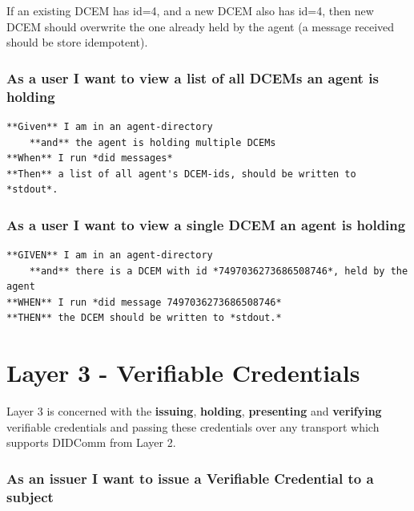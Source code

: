 If an existing DCEM has id=4, and a new DCEM also has id=4, then new
DCEM should overwrite the one already held by the agent (a message
received should be store idempotent).

\hypertarget{as-a-user-i-want-to-view-a-list-of-all-dcems-an-agent-is-holding}{%
\subsubsection{As a user I want to view a list of all DCEMs an agent is
holding}\label{as-a-user-i-want-to-view-a-list-of-all-dcems-an-agent-is-holding}}

\begin{lstlisting}
**Given** I am in an agent-directory
    **and** the agent is holding multiple DCEMs
**When** I run *did messages*
**Then** a list of all agent's DCEM-ids, should be written to *stdout*.
\end{lstlisting}

\hypertarget{as-a-user-i-want-to-view-a-single-dcem-an-agent-is-holding}{%
\subsubsection{As a user I want to view a single DCEM an agent is
holding}\label{as-a-user-i-want-to-view-a-single-dcem-an-agent-is-holding}}

\begin{lstlisting}
**GIVEN** I am in an agent-directory
    **and** there is a DCEM with id *7497036273686508746*, held by the agent
**WHEN** I run *did message 7497036273686508746*
**THEN** the DCEM should be written to *stdout.*
\end{lstlisting}

\hypertarget{layer-3---verifiable-credentials}{%
\section{Layer 3 - Verifiable
Credentials}\label{layer-3---verifiable-credentials}}

Layer 3 is concerned with the \textbf{issuing}, \textbf{holding},
\textbf{presenting} and \textbf{verifying} verifiable credentials and
passing these credentials over any transport which supports DIDComm from
Layer 2.

\hypertarget{as-an-issuer-i-want-to-issue-a-verifiable-credential-to-a-subject}{%
\subsubsection{As an issuer I want to issue a Verifiable Credential to a
subject}\label{as-an-issuer-i-want-to-issue-a-verifiable-credential-to-a-subject}}


